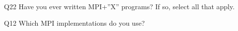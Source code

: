 \begin{description}%
\item{Q22} Have you ever written MPI+”X” programs? If so, select all that apply.%
\item{Q12} Which MPI implementations do you use?%
\end{description}%
